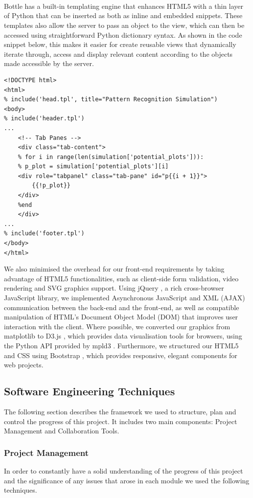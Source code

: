 \documentclass[a4paper,11pt]{article}
\begin{document}
\\
\\
\\ 
Bottle has a built-in templating engine that enhances HTML5 with a thin layer of Python that can be inserted as both as inline and embedded snippets. These templates also allow the server to pass an object to the view, which can then be accessed using straightforward Python dictionary syntax. As shown in the code snippet below, this makes it easier for create reusable views that dynamically iterate through, access and display relevant content according to the objects made accessible by the server.

\begin{verbatim}
<!DOCTYPE html>
<html>
% include('head.tpl', title="Pattern Recognition Simulation")
<body>
% include('header.tpl')
...
	<!-- Tab Panes -->
	<div class="tab-content">
	% for i in range(len(simulation['potential_plots'])):
	% p_plot = simulation['potential_plots'][i]
	<div role="tabpanel" class="tab-pane" id="p{{i + 1}}">
		{{!p_plot}}
	</div>
	%end
	</div>
...
% include('footer.tpl')
</body>
</html>
\end{verbatim}

We also minimised the overhead for our front-end requirements by taking advantage of HTML5 functionalities, such as client-side form validation, video rendering and SVG graphics support. Using jQuery \cite{jquery}, a rich cross-browser JavaScript library, we implemented Asynchronous JavaScript and XML (AJAX) communication between the back-end and the front-end, as well as compatible manipulation of HTML's Document Object Model (DOM) that improves user interaction with the client. Where possible, we converted our graphics from matplotlib to D3.js \cite{d3js}, which provides data visualisation tools for browsers, using the Python API provided by mpld3 \cite{mpld3}. Furthermore, we structured our HTML5 and CSS using Bootstrap \cite{bstrap}, which provides responsive, elegant components for web projects. 


\subsection{Software Engineering Techniques}
The following section describes the framework we used to structure, plan and control the progress of this project.
It includes two main components: Project Management and Collaboration Tools.
\subsubsection{Project Management}
In order to constantly have a solid understanding of the progress of this project and the significance of any issues that arose in each module we used the following techniques.
\end{document}
